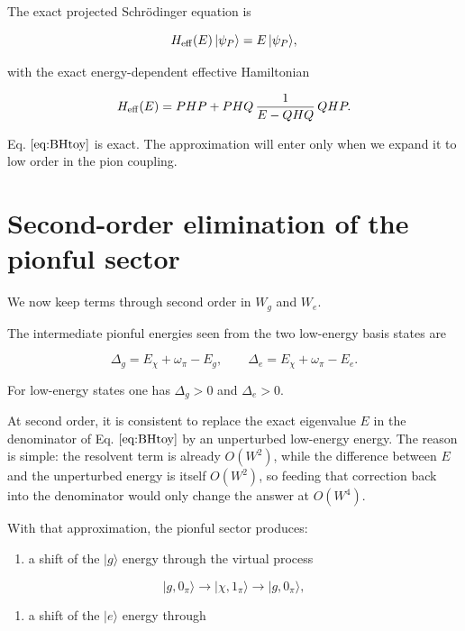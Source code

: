 \documentclass[
]{article}
\renewcommand{\[}{\begin{equation}}
\renewcommand{\]}{\end{equation}}
\providecommand{\tightlist}{%
  \setlength{\itemsep}{0pt}\setlength{\parskip}{0pt}}
\begin{document}
The exact projected Schrödinger equation is

\[
H_{\rm eff}(E)\,|\psi_P\rangle = E\,|\psi_P\rangle,
\label{eq:BHeigen}
\]

with the exact energy-dependent effective Hamiltonian

\[
H_{\rm eff}(E) =
PHP + PHQ\,\frac{1}{E-QHQ}\,QHP.
\label{eq:BHtoy}
\]

Eq. \(\ref{eq:BHtoy}\) is exact. The approximation will enter only when
we expand it to low order in the pion coupling.

\section{Second-order elimination of the pionful
sector}\label{second-order-elimination-of-the-pionful-sector}

We now keep terms through second order in \(W_g\) and \(W_e\).

The intermediate pionful energies seen from the two low-energy basis
states are

\[
\Delta_g = E_\chi + \omega_\pi - E_g,
\qquad
\Delta_e = E_\chi + \omega_\pi - E_e.
\label{eq:gapDefs}
\]

For low-energy states one has \(\Delta_g > 0\) and \(\Delta_e > 0\).

At second order, it is consistent to replace the exact eigenvalue \(E\)
in the denominator of Eq. \(\ref{eq:BHtoy}\) by an unperturbed
low-energy energy. The reason is simple: the resolvent term is already
\(O(W^2)\), while the difference between \(E\) and the unperturbed
energy is itself \(O(W^2)\), so feeding that correction back into the
denominator would only change the answer at \(O(W^4)\).

With that approximation, the pionful sector produces:

\begin{enumerate}
\def\labelenumi{\arabic{enumi}.}
\tightlist
\item
  a shift of the \(|g\rangle\) energy through the virtual process
\end{enumerate}

\[
|g,0_\pi\rangle \to |\chi,1_\pi\rangle \to |g,0_\pi\rangle,
\]

\begin{enumerate}
\def\labelenumi{\arabic{enumi}.}
\setcounter{enumi}{1}
\tightlist
\item
  a shift of the \(|e\rangle\) energy through
\end{enumerate}
\end{document}
